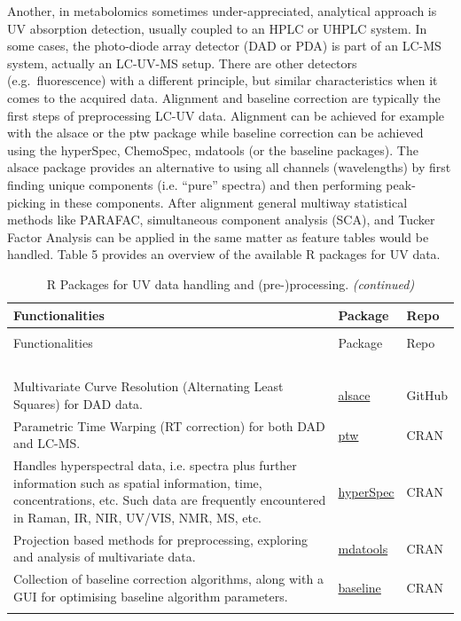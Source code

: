 \documentclass[]{article}
\begin{document}
Another, in metabolomics sometimes under-appreciated, analytical approach is UV absorption detection, usually coupled to an HPLC or UHPLC system. In some cases, the photo-diode array detector (DAD or PDA) is part of an LC-MS system, actually an LC-UV-MS setup. There are other detectors (e.g.~fluorescence) with a different principle, but similar characteristics when it comes to the acquired data. Alignment and baseline correction are typically the first steps of preprocessing LC-UV data. Alignment can be achieved for example with the alsace or the ptw package while baseline correction can be achieved using the hyperSpec, ChemoSpec, mdatools (or the baseline packages). The alsace package provides an alternative to using all channels (wavelengths) by first finding unique components (i.e. ``pure'' spectra) and then performing peak-picking in these components. After alignment general multiway statistical methods like PARAFAC, simultaneous component analysis (SCA), and Tucker Factor Analysis can be applied in the same matter as feature tables would be handled. Table 5 provides an overview of the available R packages for UV data.

\begin{longtable}[t]{>{\raggedright\arraybackslash}p{30em}>{\raggedright\arraybackslash}p{10em}>{\raggedright\arraybackslash}p{3em}}
\caption{\label{tab:tab5}R Packages for UV data handling and (pre-)processing.}\\
\toprule
Functionalities & Package & Repo\\
\midrule
\endfirsthead
\caption[]{\label{tab:tab5}R Packages for UV data handling and (pre-)processing. \textit{(continued)}}\\
\toprule
Functionalities & Package & Repo\\
\midrule
\endhead
\
\endfoot
\bottomrule
\endlastfoot
\rowcolor{gray!6}  \addlinespace[0.3em]
\multicolumn{3}{l}{\textbf{DAD}}\\
Multivariate Curve Resolution (Alternating Least Squares) for DAD data. & \href{https://github.com/rwehrens/alsace}{alsace} & GitHub\\
Parametric Time Warping (RT correction) for both DAD and LC-MS. & \href{https://cran.r-project.org/package=ptw}{ptw} & CRAN\\
\rowcolor{gray!6}  Handles hyperspectral data, i.e. spectra plus further information such as spatial information, time, concentrations, etc. Such data are frequently encountered in Raman, IR, NIR, UV/VIS, NMR, MS, etc. & \href{https://cran.r-project.org/package=ChemoSpec}{hyperSpec} & CRAN\\
Projection based methods for preprocessing, exploring and analysis of multivariate data. & \href{https://cran.r-project.org/package=mdatools}{mdatools} & CRAN\\
\rowcolor{gray!6}  Collection of baseline correction algorithms, along with a GUI for optimising baseline algorithm parameters. & \href{https://cran.r-project.org/package=baseline}{baseline} & CRAN\\*
\end{longtable}
\end{document}
